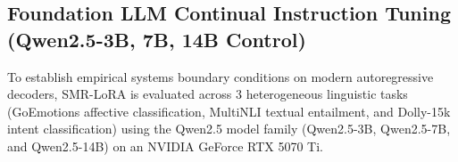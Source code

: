 \documentclass{article}
\begin{document}
\begin{table}[ht]
\centering
\begin{minipage}[t]{0.48\textwidth}
\caption{\textbf{ViT-Tiny Generalization (Split CIFAR-10)}.}
\label{tab:vit_results}
\vskip 0.02in
\end{minipage}\hfill
\begin{minipage}[t]{0.48\textwidth}
\caption{\textbf{SMR-LoRA on ViT-Tiny (5 Tasks, $|\mathcal{M}|=0$)}.}
\label{tab:smr_lora_results}
\vskip 0.02in
\end{minipage}
\end{table}

\subsection{Foundation LLM Continual Instruction Tuning (Qwen2.5-3B, 7B, 14B Control)}
\label{sec:app_qwen_foundation}
To establish empirical systems boundary conditions on modern autoregressive decoders, SMR-LoRA is evaluated across 3 heterogeneous linguistic tasks (GoEmotions affective classification, MultiNLI textual entailment, and Dolly-15k intent classification) using the Qwen2.5 model family (Qwen2.5-3B, Qwen2.5-7B, and Qwen2.5-14B) on an NVIDIA GeForce RTX 5070 Ti.
\end{document}

